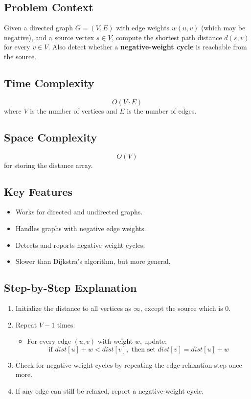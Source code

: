 \documentclass[14pt,a4paper]{extarticle}
\begin{document}
\subsection{Problem Context}
Given a directed graph $G = (V, E)$ with edge weights $w(u, v)$ (which may be negative), and a source vertex $s \in V$, compute the shortest path distance $d(s, v)$ for every $v \in V$. Also detect whether a \textbf{negative-weight cycle} is reachable from the source.

\subsection{Time Complexity}
\[
O(V \cdot E)
\]
where $V$ is the number of vertices and $E$ is the number of edges.

\subsection{Space Complexity}
\[
O(V)
\]
for storing the distance array.

\subsection{Key Features}
\begin{itemize}[leftmargin=1.5em]
  \item Works for directed and undirected graphs.
  \item Handles graphs with negative edge weights.
  \item Detects and reports negative weight cycles.
  \item Slower than Dijkstra’s algorithm, but more general.
\end{itemize}

\subsection{Step-by-Step Explanation}
\begin{enumerate}[leftmargin=1.5em]
  \item Initialize the distance to all vertices as $\infty$, except the source which is 0.
  \item Repeat $V - 1$ times:
  \begin{itemize}
    \item For every edge $(u, v)$ with weight $w$, update:
    \[
    \text{if } dist[u] + w < dist[v], \text{ then set } dist[v] = dist[u] + w
    \]
  \end{itemize}
  \item Check for negative-weight cycles by repeating the edge-relaxation step once more.
  \item If any edge can still be relaxed, report a negative-weight cycle.
\end{enumerate}
\end{document}
